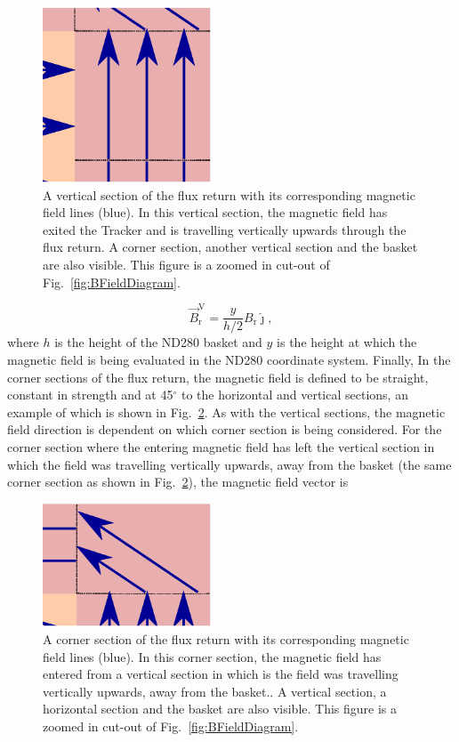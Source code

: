 \begin{figure}
  \centering
  \includegraphics[width=5cm]{images/magnetic_field/BFieldDiagramVerticalSection}
  \caption{A vertical section of the flux return with its corresponding magnetic field lines (blue).  In this vertical section, the magnetic field has exited the Tracker and is travelling vertically upwards through the flux return. A corner section, another vertical section and the basket are also visible.  This figure is a zoomed in cut-out of Fig.~\ref{fig:BFieldDiagram}.}
  \label{fig:BFieldDiagramVerticalSection}
\end{figure}
\begin{equation}
  \overrightarrow{B}^{\textrm{V}}_{\textrm{r}} = \frac{y}{h/2}{B_{\textrm{r}}}\hat{\jmath},
  \label{eqn:VerticalReturnBFieldVector}
\end{equation}
where $h$ is the height of the ND280 basket and $y$ is the height at which the magnetic field is being evaluated in the ND280 coordinate system.  
\newline
\newline
Finally, In the corner sections of the flux return, the magnetic field is defined to be straight, constant in strength and at 45$^\circ$ to the horizontal and vertical sections, an example of which is shown in Fig.~\ref{fig:BFieldDiagramCornerSection}.  As with the vertical sections, the magnetic field direction is dependent on which corner section is being considered.  For the corner section where the entering magnetic field has left the vertical section in which the field was travelling vertically upwards, away from the basket (the same corner section as shown in Fig.~\ref{fig:BFieldDiagramCornerSection}), the magnetic field vector is
\begin{figure}
  \centering
  \includegraphics[width=5cm]{images/magnetic_field/BFieldDiagramCornerSection}
  \caption{A corner section of the flux return with its corresponding magnetic field lines (blue).  In this corner section, the magnetic field has entered from a vertical section in which is the field was travelling vertically upwards, away from the basket.. A vertical section, a horizontal section and the basket are also visible.  This figure is a zoomed in cut-out of Fig.~\ref{fig:BFieldDiagram}.}
  \label{fig:BFieldDiagramCornerSection}
\end{figure}
